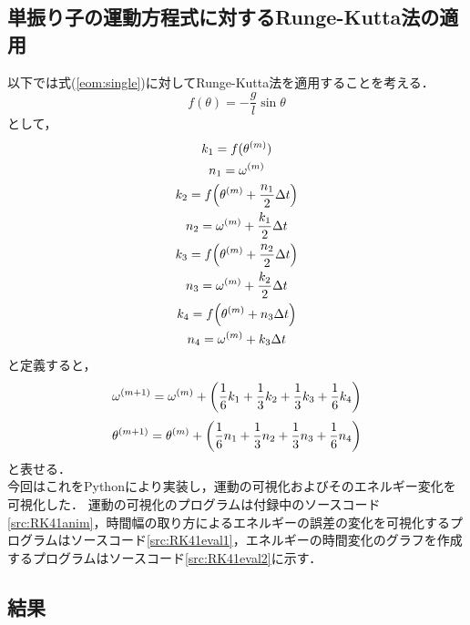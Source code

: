 \documentclass[a4paper,11pt]{jsarticle}
\begin{document}
\subsection{単振り子の運動方程式に対するRunge-Kutta法の適用}
以下では式(\ref{eom:single})に対してRunge-Kutta法を適用することを考える．
\begin{equation}
  f(\theta) = -\dfrac{g}{l}\sin{\theta}
\end{equation}
として，
\begin{gather}
  k_1 = f(\theta^{(m)}) \\
  n_1 = \omega^{(m)} \\
  k_2 = f\qty(\theta^{(m)}+\dfrac{n_1}{2}\Delta t) \\
  n_2 = \omega^{(m)} + \dfrac{k_1}{2}\Delta t \\
  k_3 = f\qty(\theta^{(m)}+\dfrac{n_2}{2}\Delta t) \\
  n_3 = \omega^{(m)} + \dfrac{k_2}{2}\Delta t \\
  k_4 = f\qty(\theta^{(m)} + n_3 \Delta t) \\
  n_4 = \omega^{(m)} + k_3 \Delta t
\end{gather}
と定義すると，
\begin{equation}
  \omega^{(m+1)} = \omega^{(m)} + \qty(\dfrac{1}{6}k_1+\dfrac{1}{3}k_2+\dfrac{1}{3}k_3+\dfrac{1}{6}k_4)
\end{equation}
\begin{equation}
  \theta^{(m+1)} = \theta^{(m)} + \qty(\dfrac{1}{6}n_1+\dfrac{1}{3}n_2+\dfrac{1}{3}n_3+\dfrac{1}{6}n_4)
\end{equation}
と表せる．\\
今回はこれをPythonにより実装し，運動の可視化およびそのエネルギー変化を可視化した．
運動の可視化のプログラムは付録中のソースコード\ref{src:RK41anim}，時間幅の取り方によるエネルギーの誤差の変化を可視化するプログラムはソースコード\ref{src:RK41eval1}，エネルギーの時間変化のグラフを作成するプログラムはソースコード\ref{src:RK41eval2}に示す．\\

\newpage
\subsection{結果}
\end{document}
